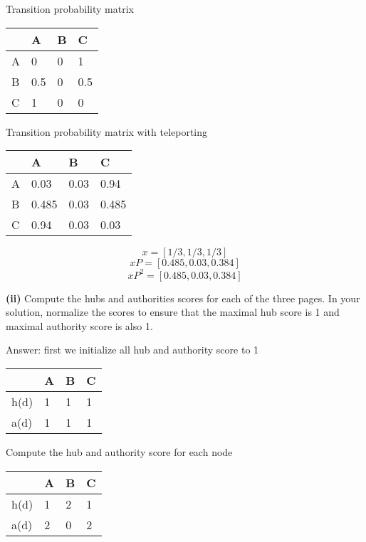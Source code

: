 \documentclass[11pt,a4paper]{report}
\begin{document}
\begin{multicols*}{2}
\noindent Transition probability matrix
\begin{center}
\begin{tabular}{ |l|l|l|l| } 
    \hline
      & A    & B  & C \\
    \hline 
    A & 0    & 0  & 1  \\
    B & 0.5  & 0  & 0.5  \\
    C & 1    & 0  & 0  \\
    \hline
\end{tabular}
\end{center}

\noindent Transition probability matrix with teleporting
\begin{center}
\begin{tabular}{ |l|l|l|l| } 
    \hline
      & A    & B    & C      \\
    \hline 
    A & 0.03  & 0.03 & 0.94  \\
    B & 0.485 & 0.03 & 0.485 \\
    C & 0.94  & 0.03 & 0.03  \\
    \hline
\end{tabular}
\end{center}

$$x = [1/3,1/3,1/3]$$
$$xP = [0.485, 0.03, 0.384]$$
$$xP^2 = [0.485, 0.03, 0.384]$$

\noindent \textbf{(ii)} Compute the hubs and authorities scores for each of the three pages. In your solution, normalize the scores to ensure that the maximal hub score is 1 and maximal authority score is also 1.

\noindent Answer: first we initialize all hub and authority score to 1
\begin{center}
\begin{tabular}{ |l|l|l|l| } 
    \hline
         & A & B & C \\
    \hline 
    h(d) & 1 & 1 & 1 \\
    a(d) & 1 & 1 & 1 \\
    \hline
\end{tabular}
\end{center}

\noindent Compute the hub and authority score for each node
\begin{center}
\begin{tabular}{ |l|l|l|l| } 
    \hline
         & A & B & C \\
    \hline 
    h(d) & 1 & 2 & 1 \\
    a(d) & 2 & 0 & 2 \\
    \hline
\end{tabular}
\end{center}


\end{multicols*}
\end{document}
